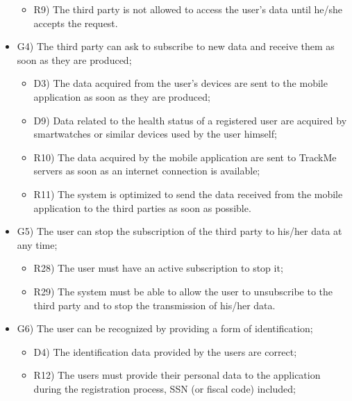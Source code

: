 \documentclass{article}
\begin{document}
\begin{legal}
\begin{legal}
\begin{legal}
\begin{itemize}
{\begin{itemize}
					\item R9) The third party is not allowed to access the user’s data until he/she accepts the request.\\
					\end{itemize}
				}
				\item G4) The third party can ask to subscribe to new data and receive them as soon as they are produced;\\
				{\normalfont
					\begin{itemize}
					\item D3) The data acquired from the user’s devices are sent to the mobile application as soon as they are produced;\\
	 				\item D9) Data related to the health status of a registered user are acquired by smartwatches or similar devices used by the user himself;\\
					\item R10) The data acquired by the mobile application are sent to TrackMe servers as soon as an internet connection is available;\\
					\item R11) The system is optimized to send the data received from the mobile application to the third parties as soon as possible.\\
					\end{itemize}
				}
				\item G5) The user can stop the subscription of the third party to his/her data at any time;\\
				{\normalfont
					\begin{itemize}
					\item R28) The user must have an active subscription to stop it;\\
	 				\item R29) The system must be able to allow the user to unsubscribe to the third party and to stop the transmission of his/her data.\\
					\end{itemize}
				}
				\item G6) The user can be recognized by providing a form of identification;\\
				{\normalfont
					\begin{itemize}
					\item D4) The identification data provided by the users are correct;\\
	 				\item R12) The users must provide their personal data to the application during the registration process, SSN (or fiscal code) included;\\

\end{itemize}}
\end{itemize}
\end{legal}
\end{legal}
\end{legal}
\end{document}
